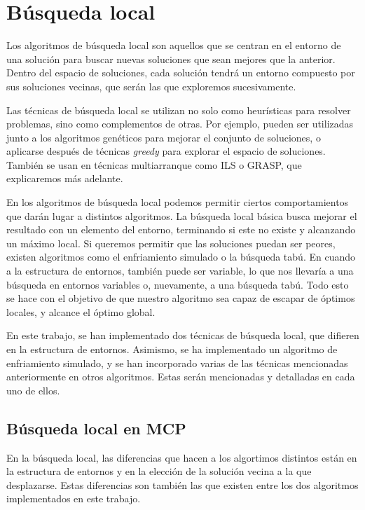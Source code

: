 \section{Búsqueda local}

Los algoritmos de búsqueda local son aquellos que se centran en el entorno de una solución
para buscar nuevas soluciones que sean mejores que la anterior. Dentro del espacio de soluciones,
cada solución tendrá un entorno compuesto por sus soluciones vecinas, que serán las que exploremos
sucesivamente.

Las técnicas de búsqueda local se utilizan no solo como heurísticas para resolver problemas,
sino como complementos de otras. Por ejemplo, pueden ser utilizadas junto a los algoritmos genéticos
para mejorar el conjunto de soluciones, o aplicarse después de técnicas \textit{greedy} para explorar
el espacio de soluciones. También se usan en técnicas multiarranque como ILS o GRASP, que explicaremos
más adelante.

En los algoritmos de búsqueda local podemos permitir ciertos comportamientos que darán lugar a
distintos algoritmos. La búsqueda local básica busca mejorar el resultado con un elemento del
entorno, terminando si este no existe y alcanzando un máximo local. Si queremos permitir que
las soluciones puedan ser peores, existen algoritmos como el enfriamiento simulado o la búsqueda
tabú. En cuando a la estructura de entornos, también puede ser variable, lo que nos llevaría
a una búsqueda en entornos variables o, nuevamente, a una búsqueda tabú. Todo esto se hace con
el objetivo de que nuestro algoritmo sea capaz de escapar de óptimos locales, y alcance el
óptimo global.

En este trabajo, se han implementado dos técnicas de búsqueda local, que difieren en la estructura de
entornos. Asimismo, se ha implementado un algoritmo de enfriamiento simulado, y se han incorporado
varias de las técnicas mencionadas anteriormente en otros algoritmos. Estas serán mencionadas y
detalladas en cada uno de ellos.

\subsection{Búsqueda local en MCP}

En la búsqueda local, las diferencias que hacen a los algortimos distintos están en  la estructura
de entornos y en la elección de la solución vecina a la que desplazarse. Estas diferencias son también
las que existen entre los dos algoritmos implementados en este trabajo.

